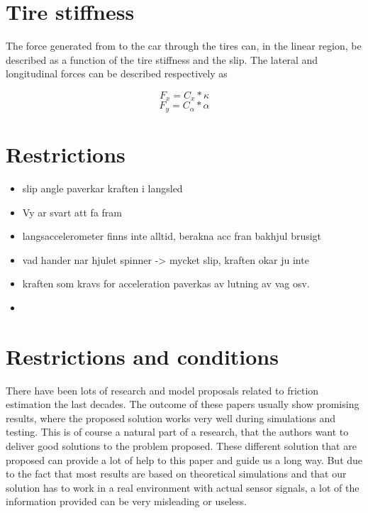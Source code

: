 \section{Tire stiffness}

The force generated from to the car through the tires can, in the linear region, be described as a function of the tire stiffness and the slip. The lateral and longitudinal forces can be described respectively as

\begin{equation}
	F_{x} = C_{x}*\kappa
\end{equation}
\begin{equation}
	F_{y} = C_{\alpha}*\alpha
\end{equation}


\section{Restrictions}

\begin{itemize}
	\item slip angle paverkar kraften i langsled
	\item Vy ar svart att fa fram
	\item langsaccelerometer finns inte alltid, berakna acc fran bakhjul brusigt
	\item vad hander nar hjulet spinner -> mycket slip, kraften okar ju inte
	\item kraften som kravs for acceleration paverkas av lutning av vag osv.
	\item 
\end{itemize}

\section{Restrictions and conditions}
There have been lots of research and model proposals related to friction estimation the last decades. The outcome of these papers usually show promising results, where the proposed solution works very well during simulations and testing. This is of course a natural part of a research, that the authors want to deliver good solutions to the problem proposed. These different solution that are proposed can provide a lot of help to this paper and guide us a long way. But due to the fact that most results are based on theoretical simulations and that our solution has to work in a real environment with actual sensor signals, a lot of the information provided can be very misleading or useless. 

